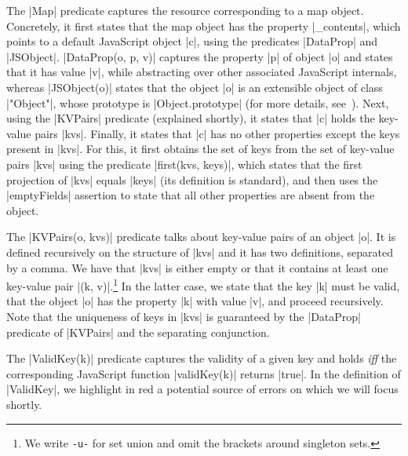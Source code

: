 The \jsinline|Map| predicate captures the resource corresponding to a map object. 
Concretely, it first states that the map object has the property \jsinline|_contents|, which points to a default JavaScript object \jsinline|c|, using the predicates \jsinline|DataProp| and \jsinline|JSObject|. 
\jsinline|DataProp(o, p, v)| captures the property \jsinline|p| of object \jsinline|o| and states that it has value \jsinline|v|, while abstracting over other associated JavaScript internals, whereas \jsinline|JSObject(o)| states that the object \jsinline|o| is an extensible object of class \jsinline|"Object"|, whose prototype is \jsinline|Object.prototype| (for more details, see~\cite{javert}). 
Next, using the \jsinline|KVPairs| predicate (explained shortly), it states that \jsinline|c| holds the key-value pairs \jsinline|kvs|. Finally, it states that \jsinline|c| has no other properties except the keys present in \jsinline|kvs|. For this, it first obtains the set of keys from the set of key-value pairs \jsinline|kvs| using the predicate \jsinline|first(kvs, keys)|, which states that the first projection of \jsinline|kvs| equals \jsinline|keys| (its definition is standard), and then uses the \jsinline|emptyFields| assertion to state that all other properties are absent from the object.

The \jsinline|KVPairs(o, kvs)| predicate talks about key-value pairs of an object \jsinline|o|. 
It is defined recursively on the structure of \jsinline|kvs| and it has two definitions, separated by a comma. 
We have that \jsinline|kvs| is either empty or that it contains at least one key-value pair \jsinline|(k, v)|.\footnote{We write {\small\texttt{-u-}} for set union and omit the brackets around singleton sets.} 
In the latter case, we state that the key \jsinline|k| must be valid, that the object \jsinline|o| has the property \jsinline|k| with value \jsinline|v|, and proceed recursively.
Note that the uniqueness of keys in \jsinline|kvs| is guaranteed by the \jsinline|DataProp| predicate of \jsinline|KVPairs| and the separating conjunction.

The \jsinline|ValidKey(k)| predicate captures the validity of a given key and holds \emph{iff} the corresponding JavaScript function \jsinline|validKey(k)| returns \jsinline|true|.
In the definition of \jsinline|ValidKey|, we highlight in red a potential source of errors on which we will focus shortly.

